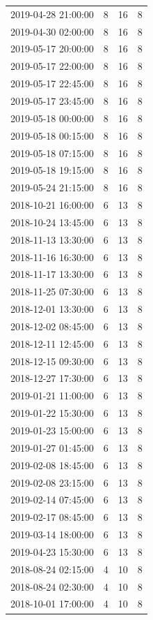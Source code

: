 \begin{tabular}{lrrr}
2019-04-28 21:00:00 & 8 & 16 & 8 \\
2019-04-30 02:00:00 & 8 & 16 & 8 \\
2019-05-17 20:00:00 & 8 & 16 & 8 \\
2019-05-17 22:00:00 & 8 & 16 & 8 \\
2019-05-17 22:45:00 & 8 & 16 & 8 \\
2019-05-17 23:45:00 & 8 & 16 & 8 \\
2019-05-18 00:00:00 & 8 & 16 & 8 \\
2019-05-18 00:15:00 & 8 & 16 & 8 \\
2019-05-18 07:15:00 & 8 & 16 & 8 \\
2019-05-18 19:15:00 & 8 & 16 & 8 \\
2019-05-24 21:15:00 & 8 & 16 & 8 \\
2018-10-21 16:00:00 & 6 & 13 & 8 \\
2018-10-24 13:45:00 & 6 & 13 & 8 \\
2018-11-13 13:30:00 & 6 & 13 & 8 \\
2018-11-16 16:30:00 & 6 & 13 & 8 \\
2018-11-17 13:30:00 & 6 & 13 & 8 \\
2018-11-25 07:30:00 & 6 & 13 & 8 \\
2018-12-01 13:30:00 & 6 & 13 & 8 \\
2018-12-02 08:45:00 & 6 & 13 & 8 \\
2018-12-11 12:45:00 & 6 & 13 & 8 \\
2018-12-15 09:30:00 & 6 & 13 & 8 \\
2018-12-27 17:30:00 & 6 & 13 & 8 \\
2019-01-21 11:00:00 & 6 & 13 & 8 \\
2019-01-22 15:30:00 & 6 & 13 & 8 \\
2019-01-23 15:00:00 & 6 & 13 & 8 \\
2019-01-27 01:45:00 & 6 & 13 & 8 \\
2019-02-08 18:45:00 & 6 & 13 & 8 \\
2019-02-08 23:15:00 & 6 & 13 & 8 \\
2019-02-14 07:45:00 & 6 & 13 & 8 \\
2019-02-17 08:45:00 & 6 & 13 & 8 \\
2019-03-14 18:00:00 & 6 & 13 & 8 \\
2019-04-23 15:30:00 & 6 & 13 & 8 \\
2018-08-24 02:15:00 & 4 & 10 & 8 \\
2018-08-24 02:30:00 & 4 & 10 & 8 \\
2018-10-01 17:00:00 & 4 & 10 & 8 \\

\end{tabular}
